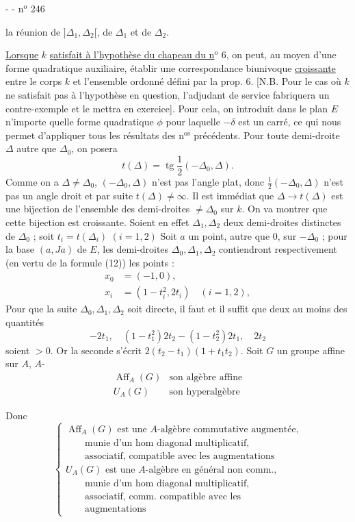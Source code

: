 -  - \hfill n$^{\mathrm{o}}$ 246

la réunion de $]\Delta_1,\Delta_2[$, de $\Delta_1$ et de $\Delta_2$.

\uline{Lorsque} $k$ \uline{satisfait à l'hypothèse du chapeau du n$^{\mathrm{o}}$} 6, on peut, au moyen d'une forme quadratique auxiliaire, établir une correspondance biunivoque \uline{croissante} entre le corps $k$ et l'ensemble ordonné défini par la prop. 6. [N.B. Pour le cas où $k$ ne satisfait pas à l'hypothèse en question, l'adjudant de service fabriquera un contre-exemple et le mettra en exercice]. Pour cela, on introduit dans le plan $E$ n'importe quelle forme quadratique $\phi$ pour laquelle $-\delta$ est un carré, ce qui nous permet d'appliquer tous les résultats des n$^{\mathrm{os}}$ précédents. Pour toute demi-droite $\Delta$ autre que $\Delta_0$, on posera
\[
t(\Delta)=\operatorname{tg}\frac12(-\Delta_0,\Delta).
\]
Comme on a $\Delta\ne\Delta_0$, $(-\Delta_0,\Delta)$ n'est pas l'angle plat, donc $\frac12(-\Delta_0,\Delta)$ n'est pas un angle droit et par suite $t(\Delta)\ne\infty$. Il est immédiat que $\Delta\longrightarrow t(\Delta)$ est une bijection de l'ensemble des demi-droites $\ne\Delta_0$ sur $k$. On va montrer que cette bijection est croissante. Soient en effet $\Delta_1,\Delta_2$ deux demi-droites distinctes de $\Delta_0$ ; soit $t_i=t(\Delta_i)$ $(i=1,2)$
Soit $a$ un point, autre que $0$, sur $-\Delta_0$ ; pour la base $(a,Ja)$ de $E$, les demi-droites $\Delta_0,\Delta_1,\Delta_2$ contiendront respectivement (en vertu de la formule (12)) les points :
\[
\begin{aligned}
x_0&=(-1,0),\\
x_i&=(1-t_i^2,2t_i)\quad(i=1,2),
\end{aligned}
\]
Pour que la suite $\Delta_0,\Delta_1,\Delta_2$ soit directe, il faut et il suffit que deux au moins des quantités
\[
-2t_1,\quad(1-t_1^2)2t_2-(1-t_2^2)2t_1,\quad2t_2
\]
soient $>0$. Or la seconde s'écrit $2(t_2-t_1)(1+t_1t_2)$.
Soit $G$ un  groupe affine sur $A$, $A$-
\[
\begin{array}{ll}
\operatorname{Aff}_A(G)&\text{son algèbre affine}\\[1ex]
U_A(G)&\text{son hyperalgèbre}
\end{array}
\]

Donc
\[
\left\{\begin{array}{l}
\operatorname{Aff}_A(G)\text{ est une }A\text{-algèbre commutative augmentée,}\\
\qquad\text{munie d'un hom diagonal multiplicatif,}\\
\qquad\text{associatif, compatible avec les augmentations}\\[1ex]
U_A(G)\text{ est une }A\text{-algèbre en général non comm.,}\\
\qquad\text{munie d'un hom diagonal multiplicatif,}\\
\qquad\text{associatif, comm. compatible avec les}\\
\qquad\text{augmentations}
\end{array}\right.
\]

